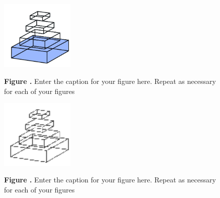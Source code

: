 \documentclass{frontiersSCNS} %
\begin{document}

\begin{figure}
\begin{center}
\includegraphics[width=3.5cm]{logo1}%
\end{center}
 \textbf{\label{fig:01} Figure .}{ Enter the caption for your figure here.  Repeat as  necessary for each of your figures }
\end{figure}

\begin{figure}
\begin{center}
\includegraphics[width=3.5cm]{logo2}%
\end{center}
 \textbf{\label{fig:02} Figure .}{ Enter the caption for your figure here.  Repeat as  necessary for each of your figures }
\end{figure}

%




\end{document}
